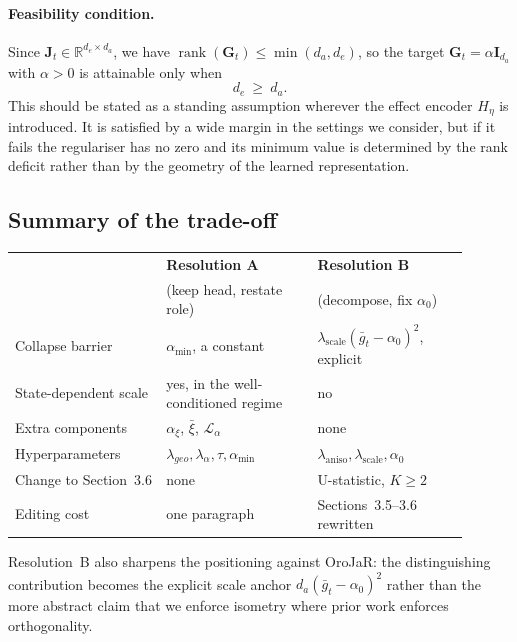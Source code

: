 ﻿\documentclass{article}
\begin{document}
\paragraph{Feasibility condition.}
Since $\mathbf{J}_t\in\mathbb{R}^{d_e\times d_a}$, we have
$\operatorname{rank}(\mathbf{G}_t)\le\min(d_a,d_e)$, so the target
$\mathbf{G}_t=\alpha\mathbf{I}_{d_a}$ with $\alpha>0$ is attainable only when
\[
  d_e\ \ge\ d_a .
\]
This should be stated as a standing assumption wherever the effect encoder
$H_\eta$ is introduced. It is satisfied by a wide margin in the settings we
consider, but if it fails the regulariser has no zero and its minimum value is
determined by the rank deficit rather than by the geometry of the learned
representation.

\subsection{Summary of the trade-off}
\label{sec:addendum-summary}

\begin{center}
\begin{tabular}{p{0.30\linewidth} p{0.30\linewidth} p{0.30\linewidth}}
\hline
& \textbf{Resolution A} & \textbf{Resolution B}\\
& (keep head, restate role) & (decompose, fix $\alpha_0$)\\
\hline
Collapse barrier
& $\alpha_{\min}$, a constant
& $\lambda_{\text{scale}}(\bar g_t-\alpha_0)^2$, explicit\\[2pt]
State-dependent scale
& yes, in the well-conditioned regime
& no\\[2pt]
Extra components
& $\alpha_\xi$, $\bar\xi$, $\mathcal{L}_\alpha$
& none\\[2pt]
Hyperparameters
& $\lambda_{geo},\lambda_\alpha,\tau,\alpha_{\min}$
& $\lambda_{\text{aniso}},\lambda_{\text{scale}},\alpha_0$\\[2pt]
Change to Section~3.6
& none
& U-statistic, $K\ge 2$\\[2pt]
Editing cost
& one paragraph
& Sections~3.5--3.6 rewritten\\
\hline
\end{tabular}
\end{center}

Resolution~B also sharpens the positioning against OroJaR: the distinguishing
contribution becomes the explicit scale anchor $d_a(\bar g_t-\alpha_0)^2$
rather than the more abstract claim that we enforce isometry where prior work
enforces orthogonality.
\end{document}
